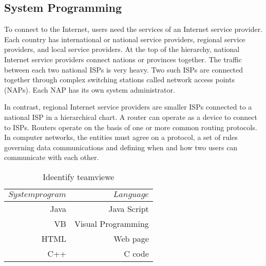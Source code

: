 \subsection{System Programming}
To connect to the Internet, users need the services of an Internet service provider. Each country has international or national service providers, regional service providers, and local service providers. At the top of the hierarchy, national Internet service providers connect nations or provinces together. The traffic between each two national ISPs is very heavy. Two such ISPs are connected together through complex switching stations called network access points (NAPs). Each NAP has its own system administrator.

In contrast, regional Internet service providers are smaller ISPs connected to a national ISP in a hierarchical chart. A router can operate as a device to connect to ISPs. Routers operate on the basis of one or more common routing protocols. In computer networks, the entities must agree on a protocol, a set of rules governing data communications and defining when and how two users can communicate with each other.
\newline
\begin{table}[htb]
\caption{Ideentify teamviewe}
\begin{center}
\begin{tabular}{|r|r|}


\hline
$System program$&$Language$\\
\hline
Java&Java Script\\
VB&Visual Programming\\
HTML&Web page\\
C++&C code\\ \hline

\end{tabular}
\end{center}
\label{table:yared}
\end{table}





